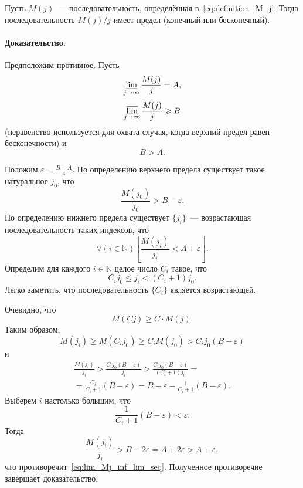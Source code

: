 \begin{theorem}
	Пусть $M(j)$~--- последовательность, определённая в~\eqref{eq:definition_M_j}.
	Тогда последовательность $M(j)/j$ имеет предел (конечный или бесконечный).
\end{theorem}

\paragraph{Доказательство.}
Предположим противное.
Пусть
\begin{equation}
	\varliminf_{j\to\infty}\frac{M(j)}{j} = A,
\end{equation}
\begin{equation}
	\varlimsup_{j\to\infty}\frac{M(j)}{j} \geq B
\end{equation}
(неравенство используется для охвата случая, когда верхний предел равен бесконечности)
и
\begin{equation}
	B > A
	.
\end{equation}

Положим $\varepsilon = \frac{B-A}{4}$.
По определению верхнего предела существует такое натуральное $j_0$,
что
\begin{equation}
	\frac{M(j_0)}{j_0} > B - \varepsilon
	.
\end{equation}
По определению нижнего предела существует $\{j_i\}$~--- возрастающая последовательность таких индексов, что
\begin{equation}
	\label{eq:lim_Mj_inf_lim_seq}
	\forall(i\in\mathbb{N})\left[ \frac{M(j_i)}{j_i} < A + \varepsilon \right]
	.
\end{equation}
Определим для каждого $i\in\mathbb{N}$ целое число $C_i$ такое, что
\begin{equation}
	\label{eq:lim_Mj_inf_lim_Ci}
	C_i j_0 \leq j_i < (C_i+1)j_0
	.
\end{equation}
Легко заметить, что последовательность $\{C_i\}$ является возрастающей.

Очевидно, что
\begin{equation}
	M(Cj) \geq C \cdot M(j)
	.
\end{equation}
Таким образом,
\begin{equation}
	M(j_i) \geq M(C_i j_0) \geq C_i M(j_0) > C_i j_0 (B-\varepsilon)
\end{equation}
и
\begin{multline}
	\frac{M(j_i)}{j_i} > \frac{C_i j_0 (B-\varepsilon)}{j_i}
	> \frac{C_i j_0 (B-\varepsilon)}{(C_i+1)j_0}
	=
	\\=
	\frac{C_i}{C_i+1}(B-\varepsilon)
	= B-\varepsilon - \frac{1}{C_i+1}(B-\varepsilon)
	.
\end{multline}
Выберем $i$ настолько большим, что
\begin{equation}
	\frac{1}{C_i+1}(B-\varepsilon) < \varepsilon
	.
\end{equation}
Тогда
\begin{equation}
	\frac{M(j_i)}{j_i} > B - 2 \varepsilon = A + 2 \varepsilon > A + \varepsilon
	,
\end{equation}
что противоречит~\eqref{eq:lim_Mj_inf_lim_seq}.
Полученное противоречие завершает доказательство.

